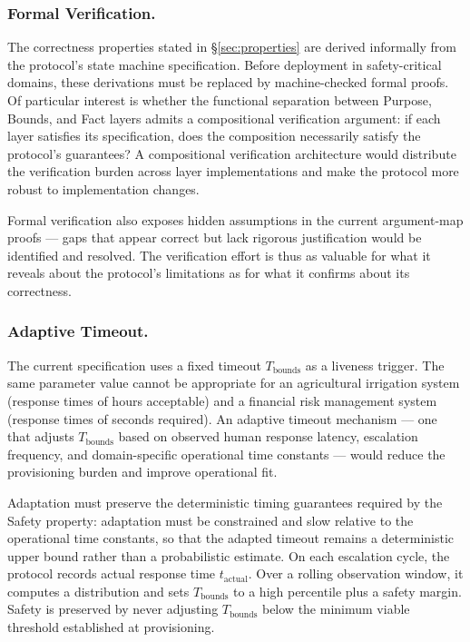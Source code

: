 \subsubsection{Formal Verification.}
The correctness properties stated in \S\ref{sec:properties} are derived informally from the protocol's state machine specification. Before deployment in safety-critical domains, these derivations must be replaced by machine-checked formal proofs. Of particular interest is whether the functional separation between Purpose, Bounds, and Fact layers admits a compositional verification argument: if each layer satisfies its specification, does the composition necessarily satisfy the protocol's guarantees? A compositional verification architecture would distribute the verification burden across layer implementations and make the protocol more robust to implementation changes.

Formal verification also exposes hidden assumptions in the current argument-map proofs — gaps that appear correct but lack rigorous justification would be identified and resolved. The verification effort is thus as valuable for what it reveals about the protocol's limitations as for what it confirms about its correctness.

\subsubsection{Adaptive Timeout.}
The current specification uses a fixed timeout $T_{\text{bounds}}$ as a liveness trigger. The same parameter value cannot be appropriate for an agricultural irrigation system (response times of hours acceptable) and a financial risk management system (response times of seconds required). An adaptive timeout mechanism — one that adjusts $T_{\text{bounds}}$ based on observed human response latency, escalation frequency, and domain-specific operational time constants — would reduce the provisioning burden and improve operational fit.

Adaptation must preserve the deterministic timing guarantees required by the Safety property: adaptation must be constrained and slow relative to the operational time constants, so that the adapted timeout remains a deterministic upper bound rather than a probabilistic estimate. On each escalation cycle, the protocol records actual response time $t_{\text{actual}}$. Over a rolling observation window, it computes a distribution and sets $T_{\text{bounds}}$ to a high percentile plus a safety margin. Safety is preserved by never adjusting $T_{\text{bounds}}$ below the minimum viable threshold established at provisioning.

